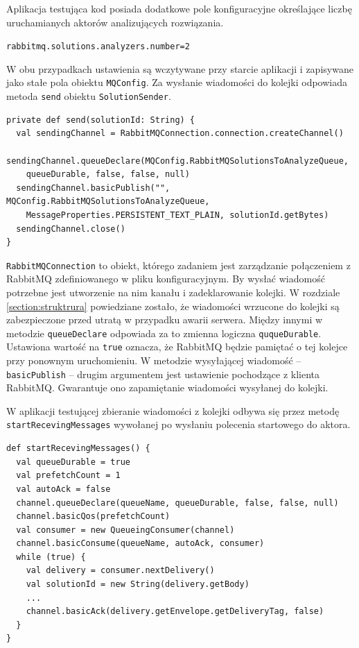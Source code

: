 \documentclass[wimgr]{xmgr}
\begin{document}
Aplikacja testująca kod posiada dodatkowe pole konfiguracyjne określające liczbę uruchamianych aktorów analizujących rozwiązania.

\begin{alltt}
rabbitmq.solutions.analyzers.number=2
\end{alltt}

W obu przypadkach ustawienia są wczytywane przy starcie aplikacji i zapisywane jako stałe pola obiektu \texttt{MQConfig}. Za wysłanie wiadomości do kolejki odpowiada metoda \texttt{send} obiektu \texttt{SolutionSender}.

\begin{verbatim}
private def send(solutionId: String) {
  val sendingChannel = RabbitMQConnection.connection.createChannel()
  sendingChannel.queueDeclare(MQConfig.RabbitMQSolutionsToAnalyzeQueue, 
    queueDurable, false, false, null)
  sendingChannel.basicPublish("", MQConfig.RabbitMQSolutionsToAnalyzeQueue, 
    MessageProperties.PERSISTENT_TEXT_PLAIN, solutionId.getBytes)
  sendingChannel.close()
}
\end{verbatim}

\texttt{RabbitMQConnection} to obiekt, którego zadaniem jest zarządzanie połączeniem z RabbitMQ zdefiniowanego w pliku konfiguracyjnym. By wysłać wiadomość potrzebne jest utworzenie na nim kanału i zadeklarowanie kolejki. W rozdziale \ref{section:struktrura} powiedziane zostało, że wiadomości wrzucone do kolejki są zabezpieczone przed utratą w przypadku awarii serwera. Między innymi w metodzie \texttt{queueDeclare} odpowiada za to zmienna logiczna \texttt{ququeDurable}. Ustawiona wartość na \texttt{true} oznacza, że RabbitMQ będzie pamiętać o tej kolejce przy ponownym uruchomieniu. W metodzie wysyłającej wiadomość -- \texttt{basicPublish} -- drugim argumentem jest ustawienie pochodzące z klienta RabbitMQ. Gwarantuje ono zapamiętanie wiadomości wysyłanej do kolejki.

W aplikacji testującej zbieranie wiadomości z kolejki odbywa się przez metodę \texttt{startRecevingMessages} wywołanej po wysłaniu polecenia startowego do aktora.

\begin{verbatim}
def startRecevingMessages() {
  val queueDurable = true
  val prefetchCount = 1
  val autoAck = false
  channel.queueDeclare(queueName, queueDurable, false, false, null)
  channel.basicQos(prefetchCount)
  val consumer = new QueueingConsumer(channel)
  channel.basicConsume(queueName, autoAck, consumer)
  while (true) {
    val delivery = consumer.nextDelivery()
    val solutionId = new String(delivery.getBody)
    ...
    channel.basicAck(delivery.getEnvelope.getDeliveryTag, false)
  }
}
\end{verbatim}
\end{document}
